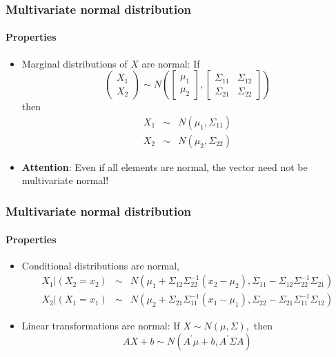 \documentclass[notes=show]{beamer}
\begin{document}
\begin{frame}\frametitle{Multivariate normal distribution}\framesubtitle{Properties}
\begin{itemize}
    \item Marginal distributions of $X$ are normal: If
        \begin{equation*}
            \left(
            \begin{array}{c}
            X_{1} \\
            X_{2}
            \end{array}
            \right) \sim N\left( \left[
            \begin{array}{c}
            \mu _{1} \\
            \mu _{2}
            \end{array}
            \right] ,\left[
            \begin{array}{cc}
            \Sigma _{11} & \Sigma _{12} \\
            \Sigma _{21} & \Sigma _{22}
            \end{array}
            \right] \right)
        \end{equation*}
        then
        \begin{eqnarray*}
            X_{1} &\sim &N\left( \mu _{1},\Sigma _{11}\right) \\
            X_{2} &\sim &N\left( \mu _{2},\Sigma _{22}\right)
        \end{eqnarray*}
    \item \textbf{Attention}: Even if all elements are normal, the vector need not be multivariate normal!
\end{itemize}
\end{frame}


\begin{frame}\frametitle{Multivariate normal distribution}\framesubtitle{Properties}
\begin{itemize}
    \item Conditional distributions are normal,
        \begin{eqnarray*}
            X_{1}|\left( X_{2}\!=\!x_{2}\right) \!\! &\sim &\!\!N\left( \mu_{1}\!+\!\Sigma _{12}\Sigma _{22}^{-1}\left( x_{2}\!-\!\mu _{2}\right),\Sigma _{11}\!-\!\Sigma _{12}\Sigma _{22}^{-1}\Sigma _{21}\right) \\
            X_{2}|\left( X_{1}\!=\!x_{1}\right) \!\! &\sim &\!\!N\left( \mu_{2}\!+\!\Sigma _{21}\Sigma _{11}^{-1}\left( x_{1}\!-\!\mu _{1}\right),\Sigma _{22}\!-\!\Sigma _{21}\Sigma _{11}^{-1}\Sigma _{12}\right)
        \end{eqnarray*}
    \item Linear transformations are normal: If $X\sim N\left( \mu ,\Sigma\right) ,$ then
        \begin{equation*}
            AX+b\sim N\left( A^{\prime }\mu +b,A^{\prime }\Sigma A\right)
        \end{equation*}
\end{itemize}
\end{frame}
\end{document}
